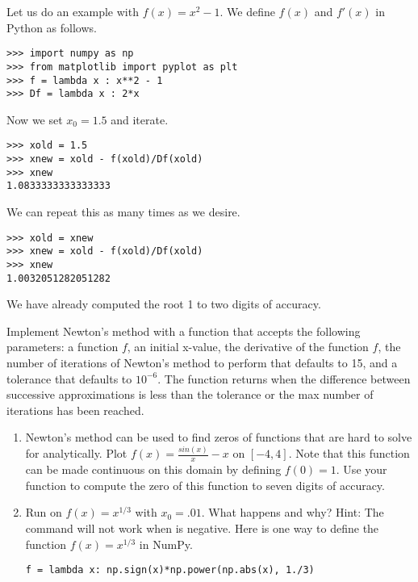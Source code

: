 Let us do an example with $f(x) = x^2-1$.
We define $f(x)$ and $f'(x)$ in Python as follows.
\begin{lstlisting}
>>> import numpy as np
>>> from matplotlib import pyplot as plt
>>> f = lambda x : x**2 - 1
>>> Df = lambda x : 2*x
\end{lstlisting}
Now we set $x_0 = 1.5$ and iterate.
\begin{lstlisting}
>>> xold = 1.5
>>> xnew = xold - f(xold)/Df(xold)
>>> xnew
1.0833333333333333
\end{lstlisting}
We can repeat this as many times as we desire.
\begin{lstlisting}
>>> xold = xnew
>>> xnew = xold - f(xold)/Df(xold)
>>> xnew
1.0032051282051282
\end{lstlisting}
We have already computed the root 1 to two digits of accuracy.


\begin{problem}
\label{prob:newton_arr}
Implement Newton's method with a function that accepts the following parameters: a function $f$, an initial x-value, the derivative of the function $f$, the number of iterations of Newton's method to perform that defaults to 15, and a tolerance that defaults to $10^{-6}$.
The function  returns when the difference between successive approximations is less than the tolerance or the max number of iterations has been reached.
\end{problem}

\begin{problem}
\leavevmode
\begin{enumerate}
\label{prob:functions}

\item Newton's method can be used to find zeros of functions that are hard to solve for analytically.
Plot $f(x) = \frac{sin(x)}{x}-x$ on $[-4, 4]$.
Note that this function can be made continuous on this domain by defining $f(0)=1$.
Use your function  to compute the zero of this function to seven digits of accuracy.
\item Run  on $f(x)=x^{1/3}$ with $x_0=.01$.
What happens and why?
Hint: The command  will not work when  is negative.
Here is one way to define the function $f(x)=x^{1/3}$ in NumPy.
\begin{lstlisting}
f = lambda x: np.sign(x)*np.power(np.abs(x), 1./3)
\end{lstlisting}
\end{enumerate}
\end{problem}

